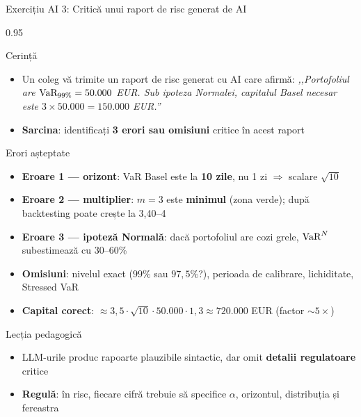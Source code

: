 \documentclass[9pt, aspectratio=169, t]{beamer}
\begin{document}
\begin{frame}[shrink=10]{Exercițiu AI 3: Critică unui raport de risc generat de AI}
    \begin{cminipage}{0.95\textwidth}
    \begin{block}{Cerință}
    \begin{itemize}\setlength{\itemsep}{0pt}
        \item Un coleg vă trimite un raport de risc generat cu AI care afirmă: \textit{,,Portofoliul are $\text{VaR}_{99\%} = 50.000$ EUR. Sub ipoteza Normalei, capitalul Basel necesar este $3 \times 50.000 = 150.000$ EUR.''}
        \item \textbf{Sarcina}: identificați \textbf{3 erori sau omisiuni} critice în acest raport
    \end{itemize}
    \end{block}
    \vspace{0.1cm}
    \begin{exampleblock}{Erori așteptate}
    \begin{itemize}\setlength{\itemsep}{0pt}
        \item \textbf{Eroare 1 --- orizont}: VaR Basel este la \textbf{10 zile}, nu 1 zi $\Rightarrow$ scalare $\sqrt{10}$
        \item \textbf{Eroare 2 --- multiplier}: $m = 3$ este \textbf{minimul} (zona verde); după backtesting poate crește la 3{,}40--4
        \item \textbf{Eroare 3 --- ipoteză Normală}: dacă portofoliul are cozi grele, $\text{VaR}^{N}$ subestimează cu 30--60\%
        \item \textbf{Omisiuni}: nivelul exact ($99\%$ sau $97{,}5\%$?), perioada de calibrare, lichiditate, Stressed VaR
        \item \textbf{Capital corect}: $\approx 3{,}5 \cdot \sqrt{10} \cdot 50.000 \cdot 1{,}3 \approx 720.000$ EUR (factor $\sim 5\times$)
    \end{itemize}
    \end{exampleblock}
    \begin{alertblock}{Lecția pedagogică}
    \begin{itemize}\setlength{\itemsep}{0pt}
        \item LLM-urile produc rapoarte plauzibile sintactic, dar omit \textbf{detalii regulatoare} critice
        \item \textbf{Regulă}: în risc, fiecare cifră trebuie să specifice $\alpha$, orizontul, distribuția și fereastra
    \end{itemize}
    \end{alertblock}
    \end{cminipage}
\end{frame}
\end{document}
